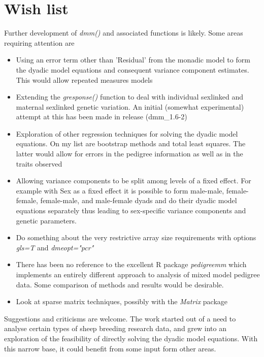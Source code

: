 \documentclass[titlepage]{article}  %
\begin{document}
\section{Wish list}
Further development of {\em dmm()} and associated functions is likely. Some areas requiring attention are
\begin{itemize}
\item Using an error term other than 'Residual' from the monadic model to form the dyadic model equations and consequent variance component estimates. This would allow repeated measures models
\item Extending the {\em gresponse()} function to deal with individual sexlinked and maternal sexlinked genetic variation. An initial (somewhat experimental) attempt at this has been made in release (dmm\_1.6-2)
\item Exploration of other regression techniques for solving the dyadic model equations. On my list are bootstrap methods and total least squares. The latter would allow for errors in the pedigree information as well as in the traits observed
\item Allowing variance components to be split among levels of a fixed effect. For example with Sex as a fixed effect it is possible to form male-male, female-female, female-male, and male-female dyads and do their dyadic model equations separately thus leading to sex-specific variance components and genetic parameters.
\item Do something about the very restrictive array size requirements with options {\em gls=T} and {\em dmeopt="pcr"}
\item There has been no reference to the excellent R package {\em pedigreemm} which implements an entirely different approach to analysis of mixed model pedigree data. Some comparison of methods and results would be desirable.
\item Look at sparse matrix techniques, possibly with the {\em Matrix} package
\end{itemize}

Suggestions and criticisms are welcome.  The work started out of a need to analyse certain types of sheep breeding research data, and grew into an exploration of the feasibility of directly solving the dyadic model equations. With this narrow base, it could benefit from some input form other areas.
\end{document}
